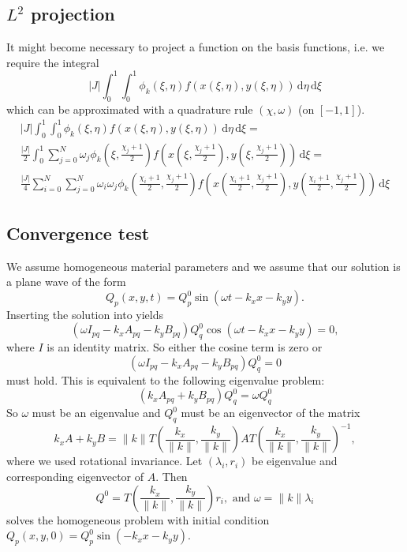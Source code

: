 \documentclass[a4paper]{scrartcl}
\newcommand{\dd}[1]{\,\mathrm{d}#1}
\begin{document}
\subsection{$L^2$ projection}
It might become necessary to project a function on the basis functions, i.e. we require the integral
\begin{equation}
 |J|\int_{0}^{1}\int_{0}^{1}\phi_k(\xi,\eta)f\left(x(\xi,\eta),y(\xi,\eta)\right)\dd{\eta}\dd{\xi}
\end{equation}
which can be approximated with a quadrature rule $(\chi, \omega)$ (on $[-1,1]$).
\begin{multline}
 |J|\int_{0}^{1}\int_{0}^{1}\phi_k(\xi,\eta)f\left(x(\xi,\eta),y(\xi,\eta)\right)\dd{\eta}\dd{\xi} = \\
 \frac{|J|}{2}\int_{0}^{1}\sum_{j=0}^N\omega_j\phi_k\left(\xi,\frac{\chi_j+1}{2}\right)f\left(x\left(\xi,\frac{\chi_j+1}{2}\right),y\left(\xi,\frac{\chi_j+1}{2}\right)\right)\dd{\xi} =\\
 \frac{|J|}{4}\sum_{i=0}^N\sum_{j=0}^N\omega_i\omega_j\phi_k\left(\frac{\chi_i+1}{2},\frac{\chi_j+1}{2}\right)f\left(x\left(\frac{\chi_i+1}{2},\frac{\chi_j+1}{2}\right),y\left(\frac{\chi_i+1}{2},\frac{\chi_j+1}{2}\right)\right)\dd{\xi}
\end{multline}

\subsection{Convergence test}
We assume homogeneous material parameters and we assume that our solution is a plane wave of the form
\begin{equation}
 Q_p(x,y,t) = Q_p^0\sin\left(\omega t-k_xx-k_yy\right).
\end{equation}
Inserting the solution into  yields
\begin{equation}
 \left(\omega I_{pq} - k_xA_{pq} - k_yB_{pq}\right)Q_q^0\cos\left(\omega t-k_xx-k_yy\right) = 0,
\end{equation}
where $I$ is an identity matrix. So either the cosine term is zero or
\begin{equation}
 \left(\omega I_{pq} - k_xA_{pq} - k_yB_{pq}\right)Q_q^0 = 0
\end{equation}
must hold. This is equivalent to the following eigenvalue problem:
\begin{equation}
 \left(k_xA_{pq} + k_yB_{pq}\right)Q_q^0 = \omega Q_q^0
\end{equation}
So $\omega$ must be an eigenvalue and $Q_q^0$ must be an eigenvector of the matrix
\begin{equation}
 k_xA + k_yB = \lVert k\rVert T\left(\frac{k_x}{\lVert k\rVert},\frac{k_y}{\lVert k\rVert}\right)AT\left(\frac{k_x}{\lVert k\rVert},\frac{k_y}{\lVert k\rVert}\right)^{-1},
\end{equation}
where we used rotational invariance. Let $(\lambda_i,r_i)$ be eigenvalue and corresponding
eigenvector of $A$. Then
\begin{equation}
 Q^0 = T\left(\frac{k_x}{\lVert k\rVert},\frac{k_y}{\lVert k\rVert}\right)r_i, \text{ and } \omega = \lVert k\rVert\lambda_i
\end{equation}
solves the homogeneous problem with initial condition $Q_p(x,y,0) = Q_p^0\sin(-k_xx-k_yy)$.
\end{document}
